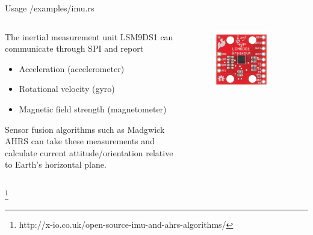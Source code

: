 \documentclass[
  aspectratio=169,
]{beamer}
\begin{document}
\begin{frame}{Usage /examples/imu.rs}
\begin{columns}[T] %
\hfill%
\begin{column}{.53\textwidth}
\vspace{-2mm}
The inertial measurement unit LSM9DS1 can communicate through SPI and report
\begin{itemize}
\item Acceleration (accelerometer)
\item Rotational velocity (gyro)
\item Magnetic field strength (magnetometer)
\end{itemize}
Sensor fusion algorithms such as \alert{Madgwick AHRS} can take these measurements and calculate current attitude/orientation relative to Earth's horizontal plane.
\end{column}%
\hfill%
\begin{column}{.47\textwidth}
\vspace{-10mm}
\begin{figure}
\includegraphics[width=0.8\textwidth,height=0.8\textheight,keepaspectratio]{lsm9ds1.jpg}
\end{figure}
\end{column}%
\end{columns}
\footnote{http://x-io.co.uk/open-source-imu-and-ahrs-algorithms/}
\end{frame}
\end{document}
